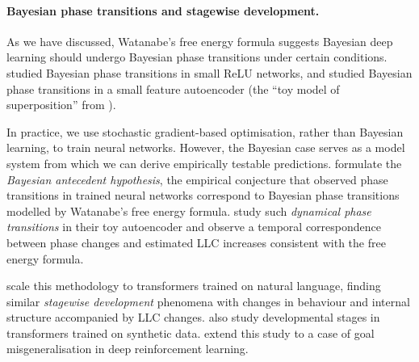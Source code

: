 \documentclass[11pt]{article}
\begin{document}
\paragraph{Bayesian phase transitions and stagewise development.}
As we have discussed, Watanabe's free energy formula suggests Bayesian deep learning should undergo Bayesian phase transitions under certain conditions. \citet{Carroll2021} studied Bayesian phase transitions in small ReLU networks, and \citet{Chen+2023} studied Bayesian phase transitions in a small feature autoencoder (the ``toy model of superposition'' from \citealp{Elhage+2022}).

In practice, we use stochastic gradient-based optimisation, rather than Bayesian learning, to train neural networks. However, the Bayesian case serves as a model system from which we can derive empirically testable predictions. \citet{Chen+2023} formulate the \emph{Bayesian antecedent hypothesis}, the empirical conjecture that observed phase transitions in trained neural networks correspond to Bayesian phase transitions modelled by Watanabe's free energy formula.
\citet{Chen+2023} study such \emph{dynamical phase transitions} in their toy autoencoder and observe a temporal correspondence between phase changes and estimated LLC increases consistent with the free energy formula.

\citet{Wang+2024,Hoogland+2025} scale this methodology to transformers trained on natural language, finding similar \emph{stagewise development} phenomena with changes in behaviour and internal structure accompanied by LLC changes. \citet{Panickssery+Vaintrob2023,Hoogland+2025,Carroll+2025,Urdshals+Urdshals2025} also study developmental stages in transformers trained on synthetic data.
\citet{Elliott+2026} extend this study to a case of goal misgeneralisation in deep reinforcement learning.
\end{document}
